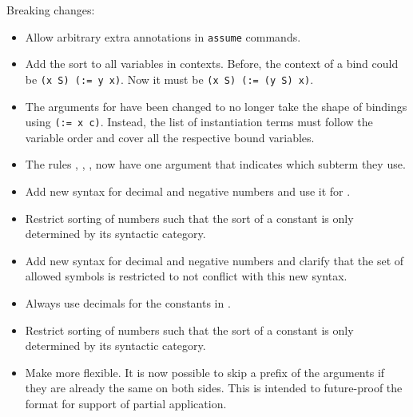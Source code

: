 \noindent
Breaking changes:
\begin{itemize}
  \item Allow arbitrary extra annotations in \texttt{assume} commands.
  \item Add the sort to all variables in contexts.  Before, the context
        of a bind could be \texttt{(x S) (:= y x)}.  Now it must
        be \texttt{(x S) (:= (y S) x)}.
  \item The arguments for  have been changed to
        no longer take the shape of bindings using \texttt{(:= x c)}.
        Instead, the list of instantiation terms must follow the variable
        order and cover all the respective bound variables.
  \item The rules , , ,
         now have one argument that indicates which subterm
        they use.
  \item Add new syntax for decimal and negative numbers and use it
        for .
  \item Restrict sorting of numbers such that the sort of a constant is
        only determined by its syntactic category.
  \item Add new syntax for decimal and negative numbers and clarify that
        the set of allowed symbols is restricted to not conflict with this
        new syntax.
  \item Always use decimals for the constants in .
  \item Restrict sorting of numbers such that the sort of a constant is
        only determined by its syntactic category.
  \item Make  more flexible.  It is now possible to skip
        a prefix of the arguments if they are already the same on both sides.
        This is intended to future-proof the format for support of partial
        application.
\end{itemize}

